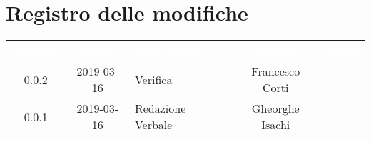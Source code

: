 \section*{Registro delle modifiche}
{
	\renewcommand{\arraystretch}{1.5}
	\centering
	\begin{longtable}{ c c  C{4cm}  c  c }
		
		\textcolor{white}{\textbf{Versione}} & \textcolor{white}{\textbf{Data}} & \textcolor{white}{\textbf{Descrizione}} & \textcolor{white}{\textbf{Autore}} & \textcolor{white}{\textbf{Ruolo}}\\
		
		0.0.2 & 2019-03-16 & Verifica & Francesco Corti & \ver{} \\
	
		0.0.1 & 2019-03-16 & Redazione Verbale & Gheorghe Isachi & \reda{}\\
		
	\end{longtable}

}